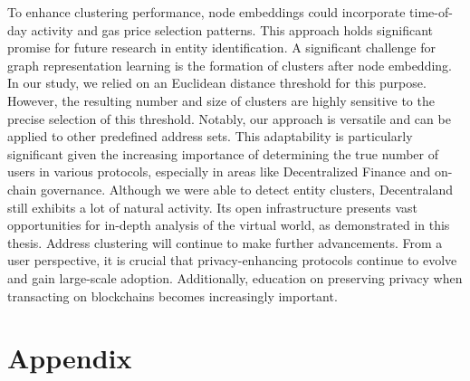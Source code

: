 \documentclass[12pt,a4paper,titlepage,oneside,english]{article}
\begin{document}
To enhance clustering performance, node embeddings could incorporate time-of-day activity and gas price selection patterns. This approach holds significant promise for future research in entity identification. \newline
A significant challenge for graph representation learning is the formation of clusters after node embedding. In our study, we relied on an Euclidean distance threshold for this purpose. However, the resulting number and size of clusters are highly sensitive to the precise selection of this threshold. \newline
Notably, our approach is versatile and can be applied to other predefined address sets. This adaptability is particularly significant given the increasing importance of determining the true number of users in various protocols, especially in areas like Decentralized Finance and on-chain governance. \newline
Although we were able to detect entity clusters, Decentraland still exhibits a lot of natural activity. Its open infrastructure presents vast opportunities for in-depth analysis of the virtual world, as demonstrated in this thesis. \newline
Address clustering will continue to make further advancements. From a user perspective, it is crucial that privacy-enhancing protocols continue to evolve and gain large-scale adoption. Additionally, education on preserving privacy when transacting on blockchains becomes increasingly important.



\newpage
\setcounter{page}{1}
\onehalfspacing
{}



\section{Appendix}
\end{document}

